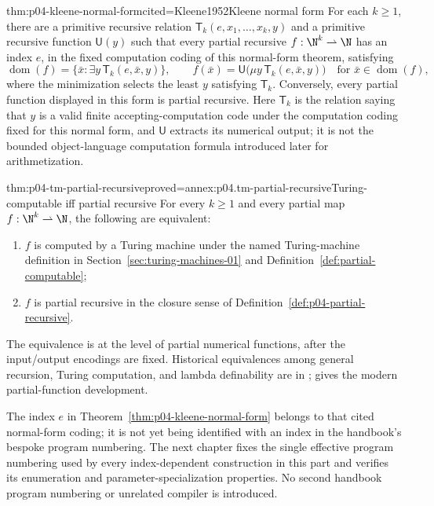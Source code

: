 \begin{hbtheorem}{thm:p04-kleene-normal-form}{cited=Kleene1952}{Kleene normal form}
For each \(k\ge1\), there are a primitive recursive relation
\(\mathsf T_k(e,x_1,\ldots,x_k,y)\) and a primitive recursive function
\(\mathsf U(y)\) such that every partial recursive
\(f:\N^k\rightharpoonup\N\) has an index \(e\), in the fixed computation
coding of this normal-form theorem, satisfying
\[
  \operatorname{dom}(f)
  =\{\bar x:\exists y\,\mathsf T_k(e,\bar x,y)\},
  \qquad
  f(\bar x)=\mathsf U\bigl(\mu y\,
    \mathsf T_k(e,\bar x,y)\bigr)
  \quad\text{for }\bar x\in\operatorname{dom}(f),
\]
where the minimization selects the least \(y\) satisfying \(\mathsf T_k\).
Conversely, every partial function displayed in this form is partial
recursive.  Here \(\mathsf T_k\) is the relation saying that \(y\) is a valid
finite accepting-computation code under the computation coding fixed for this
normal form, and \(\mathsf U\) extracts its numerical output; it is not the
bounded object-language computation formula introduced later for
arithmetization.
\end{hbtheorem}


\begin{hbtheorem}{thm:p04-tm-partial-recursive}{proved=annex:p04.tm-partial-recursive}{Turing-computable iff partial recursive}
For every \(k\ge1\) and every partial map
\(f:\N^k\rightharpoonup\N\), the following are equivalent:
\begin{enumerate}
  \item \(f\) is computed by a Turing machine under
        the named Turing-machine definition in
        Section~\ref{sec:turing-machines-01} and
        Definition~\ref{def:partial-computable};
  \item \(f\) is partial recursive in the closure sense of
        Definition~\ref{def:p04-partial-recursive}.
\end{enumerate}
\end{hbtheorem}

The equivalence is at the level of partial numerical functions, after the
input/output encodings are fixed.  Historical equivalences among general recursion,
Turing computation, and lambda definability are in
\cite{Kleene1936,Turing1937Lambda}; \cite{Kleene1952} gives the modern
partial-function development.

The index \(e\) in Theorem~\ref{thm:p04-kleene-normal-form} belongs to that
cited normal-form coding; it is not yet being identified with an index in the
handbook's bespoke program numbering.  The next chapter fixes the single
effective program numbering used by every index-dependent construction in this
part and verifies its enumeration and parameter-specialization properties.  No
second handbook program numbering or unrelated compiler is introduced.

